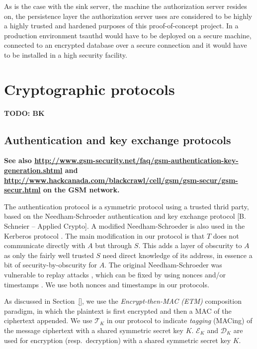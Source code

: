 As is the case with the sink server, the machine the authorization server resides on, the persistence layer the authorization server uses are considered to be highly a highly trusted and hardened purposes of this proof-of-concept project. In a production environment tsauthd would have to be deployed on a secure machine, connected to an encrypted database over a secure connection and it would have to be installed in a high security facility.

\section{Cryptographic protocols}
\label{sec:cryptographic-protocols}

\textbf{TODO: BK}

\subsection{Authentication and key exchange protocols}
\label{sec:cryptographic-protocols-authentication}

\textbf{See also \url{http://www.gsm-security.net/faq/gsm-authentication-key-generation.shtml} and \url{http://www.hackcanada.com/blackcrawl/cell/gsm/gsm-secur/gsm-secur.html} on the GSM network.}

The authentication protocol is a symmetric protocol using a trusted thrid party, based on the Needham-Schroeder authentication and key exchange protocol  [B. Schneier -- Applied Crypto]. A modified Needham-Schroeder is also used in the Kerberos protocol . The main modification in our protocol is that $T$ does not communicate directly with $A$ but through $S$. This adds a layer of obscurity to $A$ as only the fairly well trusted $S$ need direct knowledge of its address, in essence a bit of security-by-obscurity for $A$.
%
The original Needham-Schroeder was vulnerable to replay attacks , which can be fixed by using nonces and/or timestamps \cite{needham1987}. We use both nonces and timestamps in our protocols.

As discussed in Section~\ref{}, we use the \textit{Encrypt-then-MAC (ETM)}  composition paradigm, in which the plaintext is first encrypted and then a MAC of the ciphertext appended. We use $\mathcal{T}_K$ in our protocol to indicate \textit{tagging} (MACing) of the message ciphertext with a shared symmetric secret key $K$. $\mathcal{E}_K$ and $\mathcal{D}_K$ are used for encryption (resp.\ decryption) with a shared symmetric secret key $K$.


